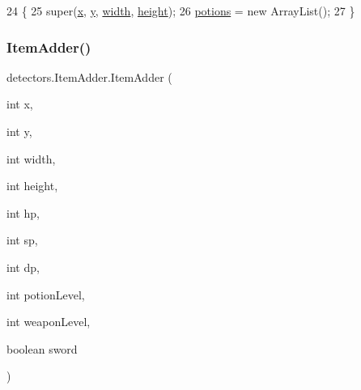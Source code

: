 \begin{DoxyCode}
24                                                                   \{
25         super(\mbox{\hyperlink{classorg_1_1newdawn_1_1slick_1_1geom_1_1_shape_a3e985bfff386c15a4efaad03d8ad60d3}{x}}, \mbox{\hyperlink{classorg_1_1newdawn_1_1slick_1_1geom_1_1_shape_a9f934baded6a1b65ebb69e7e5f80ea00}{y}}, \mbox{\hyperlink{classorg_1_1newdawn_1_1slick_1_1geom_1_1_rectangle_a967e1823f62daf45abb142779d1be62d}{width}}, \mbox{\hyperlink{classorg_1_1newdawn_1_1slick_1_1geom_1_1_rectangle_a3bd010fdce636fc11ed0e0ad4d4b4a0a}{height}});
26         \mbox{\hyperlink{classdetectors_1_1_item_adder_a26e510502039e2245428cf040fafbd9c}{potions}} = \textcolor{keyword}{new} ArrayList();
27     \}
\end{DoxyCode}
\mbox{\label{classdetectors_1_1_item_adder_a8a6ffb3f3af90b2c88fd613781be483d}} 
\subsubsection{\texorpdfstring{Item\+Adder()}{ItemAdder()}\hspace{0.1cm}{\footnotesize\ttfamily [2/2]}}
{\footnotesize\ttfamily detectors.\+Item\+Adder.\+Item\+Adder (\begin{DoxyParamCaption}\item[{int}]{x,  }\item[{int}]{y,  }\item[{int}]{width,  }\item[{int}]{height,  }\item[{int}]{hp,  }\item[{int}]{sp,  }\item[{int}]{dp,  }\item[{int}]{potion\+Level,  }\item[{int}]{weapon\+Level,  }\item[{boolean}]{sword }\end{DoxyParamCaption})\hspace{0.3cm}{\ttfamily [inline]}}


